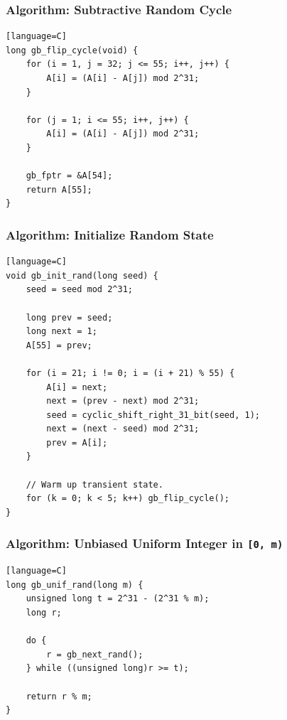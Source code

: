 \documentclass[11pt]{article}
\begin{document}
\subsubsection{Algorithm: Subtractive Random Cycle}\label{algorithm-subtractive-random-cycle}

\begin{verbatim}[language=C]
long gb_flip_cycle(void) {
    for (i = 1, j = 32; j <= 55; i++, j++) {
        A[i] = (A[i] - A[j]) mod 2^31;
    }

    for (j = 1; i <= 55; i++, j++) {
        A[i] = (A[i] - A[j]) mod 2^31;
    }

    gb_fptr = &A[54];
    return A[55];
}
\end{verbatim}

\subsubsection{Algorithm: Initialize Random State}\label{algorithm-initialize-random-state}

\begin{verbatim}[language=C]
void gb_init_rand(long seed) {
    seed = seed mod 2^31;

    long prev = seed;
    long next = 1;
    A[55] = prev;

    for (i = 21; i != 0; i = (i + 21) % 55) {
        A[i] = next;
        next = (prev - next) mod 2^31;
        seed = cyclic_shift_right_31_bit(seed, 1);
        next = (next - seed) mod 2^31;
        prev = A[i];
    }

    // Warm up transient state.
    for (k = 0; k < 5; k++) gb_flip_cycle();
}
\end{verbatim}

\subsubsection{\texorpdfstring{Algorithm: Unbiased Uniform Integer in \texttt{{[}0,\ m)}}{Algorithm: Unbiased Uniform Integer in {[}0, m)}}\label{algorithm-unbiased-uniform-integer-in-0-m}

\begin{verbatim}[language=C]
long gb_unif_rand(long m) {
    unsigned long t = 2^31 - (2^31 % m);
    long r;

    do {
        r = gb_next_rand();
    } while ((unsigned long)r >= t);

    return r % m;
}
\end{verbatim}
\end{document}
